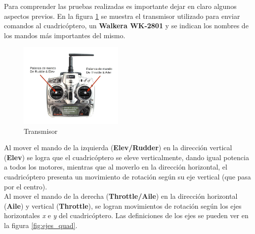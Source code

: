 \documentclass[main]{subfiles}
\begin{document}
Para comprender las pruebas realizadas es importante dejar en claro algunos aspectos previos. En la figura \ref{fig:tx} se muestra el transmisor utilizado para enviar comandos al cuadricóptero, un \textbf{Walkera WK-2801} y se indican los nombres de los mandos más importantes del mismo.


\begin{figure}
	\vspace{-20pt}
	\begin{center}
	\includegraphics[width=0.45\textwidth]{./pics_sniffer/tx.jpg}
	\end{center}
	\vspace{-25pt}
	\caption{Transmisor}
	\label{fig:tx}
	\vspace{20pt}
\end{figure}

Al mover el mando de la izquierda (\textbf{Elev/Rudder}) en la dirección vertical (\textbf{Elev}) se logra que el cuadricóptero se eleve verticalmente, dando igual potencia a todos los motores, mientras que al moverlo en la dirección horizontal, el cuadricóptero presenta un movimiento de rotación según su eje vertical (que pasa por el centro).\\

Al mover el mando de la derecha (\textbf{Throttle/Aile}) en la dirección horizontal (\textbf{Aile}) y vertical (\textbf{Throttle}), se logran movimientos de rotación según los ejes horizontales \emph{x} e \emph{y} del cuadricóptero. Las definiciones de los ejes se pueden ver en la figura \ref{fig:ejes_quad}.\\
\end{document}
